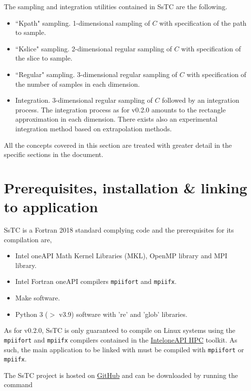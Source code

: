\documentclass[10pt,a4paper]{article}
\begin{document}
The sampling and integration utilities contained in SsTC are the following.
\begin{tcolorbox}\begin{itemize}
\item ``Kpath" sampling. 1-dimensional sampling of $C$ with specification of the path to sample.
\item ``Kslice" sampling. 2-dimensional regular sampling of $C$ with specification of the slice to sample.
\item ``Regular" sampling. 3-dimensional regular sampling of $C$ with specification of the number of samples in each dimension.
\item Integration. 3-dimensional regular sampling of $C$ followed by an integration process. The integration process as for v0.2.0 amounts to the rectangle approximation in each dimension. There exists also an experimental integration method based on extrapolation methods.
\end{itemize}\end{tcolorbox}
All the concepts covered in this section are treated with greater detail in the specific sections in the document.
\section{Prerequisites, installation \& linking to application}\label{sec:install}
SsTC is a Fortran 2018 standard complying code and the prerequisites for its compilation are,
\begin{tcolorbox}\begin{itemize}
\item Intel oneAPI Math Kernel Libraries (MKL), OpenMP library and MPI library.
\item Intel Fortran oneAPI compilers \verb|mpiifort| and \verb|mpiifx|.
\item Make software.
\item Python 3 ($>$ v3.9) software with 're' and 'glob' libraries.
\end{itemize}\end{tcolorbox}
As for v0.2.0, SsTC is only guaranteed to compile on Linux systems using the \verb|mpiifort| and \verb|mpiifx| compilers contained in the \href{https://www.intel.com/content/www/us/en/developer/tools/oneapi/hpc-toolkit.html}{Intel\textregistered oneAPI HPC} toolkit. As such, the main application to be linked with must be compiled with \verb|mpiifort| or \verb|mpiifx|.

The SsTC project is hosted on \href{https://github.com/irukoa/SsTC}{GitHub} and can be downloaded by running the command
\end{document}
